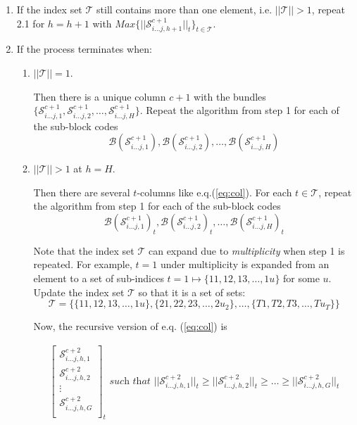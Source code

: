 \documentclass[12pt]{article}  %
\begin{document}
\begin{enumerate}
\begin{enumerate}
\item If the index set $\mathcal{T}$ still contains more than one element, i.e. $||\mathcal{T}||>1$, repeat 2.1 for $h=h+1$ with $Max \{||\mathcal{S}^{c+1}_{i \dots j,h+1}||_t\}_{t\in\mathcal{T}}$.





\item If the process terminates when:

\begin{enumerate}
\item $||\mathcal{T}||=1$.

Then there is a unique column $c+1$ with the bundles 
$\{
\mathcal{S}^{c+1}_{i \dots j,1},
\mathcal{S}^{c+1}_{i \dots j,2},
\dots,
\mathcal{S}^{c+1}_{i \dots j,H}
\}$. Repeat the algorithm from step 1 for each of the sub-block codes 
$$
\mathcal{B}(\mathcal{S}^{c+1}_{i \dots j,1}),
\mathcal{B}(\mathcal{S}^{c+1}_{i \dots j,2}),
\dots,
\mathcal{B}(\mathcal{S}^{c+1}_{i \dots j,H})
$$

\item $||\mathcal{T}||>1$ at $h=H$.

Then there are several $t$-columns like e.q.(\ref{eq:col}). For each $t \in \mathcal{T}$, repeat the algorithm from step 1 for each of the sub-block codes
$$
\mathcal{B}(\mathcal{S}^{c+1}_{i \dots j,1})_t,
\mathcal{B}(\mathcal{S}^{c+1}_{i \dots j,2})_t,
\dots,
\mathcal{B}(\mathcal{S}^{c+1}_{i \dots j,H})_t
$$



Note that the index set $\mathcal{T}$ can expand due to \emph{multiplicity} when step 1 is repeated. For example, $t=1$ under multiplicity is expanded from an element to a set of sub-indices $t=1 \mapsto \{11,12,13,\dots,1u\}$ for some $u$. Update the index set $\mathcal{T}$ so that it is a set of sets: 
$$\mathcal{T} = \{ 
\{11,12,13,\dots,1u\},
\{21,22,23,\dots,2u_2\},
\dots,
\{T1,T2,T3,\dots,Tu_T\}
 \}$$

Now, the recursive version of e.q. (\ref{eq:col}) is

\begin{align}\label{eq:col2}
\left[\begin{array}{c}
\mathcal{S}^{c+2}_{i \dots j,h,1}\\
\mathcal{S}^{c+2}_{i \dots j,h,2}\\
\vdots \\
\mathcal{S}^{c+2}_{i \dots j,h,G}\\
\end{array}\right]_t
\textit{ such that \ }
||\mathcal{S}^{c+2}_{i \dots j,h,1}||_t \geq
||\mathcal{S}^{c+2}_{i \dots j,h,2}||_t \geq
\dots \geq
||\mathcal{S}^{c+2}_{i \dots j,h,G}||_t
\end{align}



\end{enumerate}
\end{enumerate}
\end{enumerate}
\end{document}
